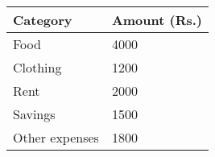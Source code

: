 \begin{table}[h!]
\centering
\begin{tabular}{|p{5cm}|p{2.5cm}|}
\hline
Category & Amount (Rs.) \\
\hline
Food & 4000 \\
\hline
Clothing & 1200 \\
\hline
Rent & 2000 \\
\hline
Savings & 1500 \\
\hline
Other expenses & 1800 \\
\hline
\end{tabular}
\end{table}
